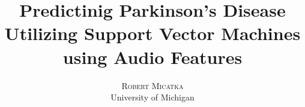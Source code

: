 \documentclass[twoside]{article}
\title{\vspace{-15mm}\fontsize{14pt}{12pt}\selectfont\textbf{Predictinig Parkinson's Disease Utilizing Support Vector Machines using Audio Features}} %
\author{
\large
\textsc{Robert Micatka}\\ %
\normalsize University of Michigan \\ %
}
\begin{document}
\maketitle 

\date{}


\begin{abstract}



 
\end{abstract}

\end{document}
